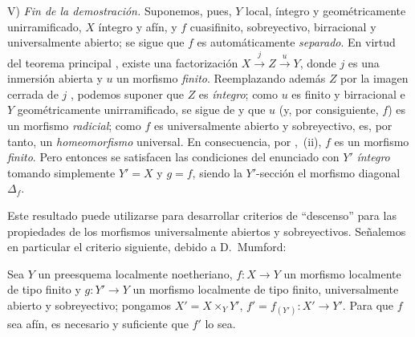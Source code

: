 V) \emph{Fin de la demostración.}
Suponemos, pues, $Y$ local, íntegro y geométricamente unirramificado, $X$ íntegro y afín, y $f$ cuasifinito, sobreyectivo, birracional y universalmente abierto; se sigue que $f$ es automáticamente \emph{separado}.
En virtud del teorema principal , existe una factorización $X\xrightarrow{j}Z\xrightarrow{u}Y$, donde $j$ es una inmersión abierta y $u$ un morfismo \emph{finito}.
Reemplazando además $Z$ por la imagen cerrada de $j$ , podemos suponer que $Z$ es \emph{íntegro}; como $u$ es finito y birracional e $Y$ geométricamente unirramificado, se sigue de  y  que $u$ (y, por consiguiente, $f$) es un morfismo \emph{radicial}; como $f$ es universalmente abierto y sobreyectivo, es, por tanto, un \emph{homeomorfismo} universal.
En consecuencia, por ,~(ii), $f$ es un morfismo \emph{finito}.
Pero entonces se satisfacen las condiciones del enunciado con $Y'$ \emph{íntegro} tomando simplemente $Y'=X$ y $g=f$, siendo la $Y'$-sección el morfismo diagonal $\Delta_f$.

Este resultado puede utilizarse para desarrollar criterios de ``descenso'' para las propiedades de los morfismos universalmente abiertos y sobreyectivos.
Señalemos en particular el criterio siguiente, debido a D.\ Mumford:

\begin{corollary}[14.5.11]
\label{IV.14.5.11}
Sea $Y$ un preesquema localmente noetheriano, $f:X\to Y$ un morfismo localmente de tipo finito y $g:Y'\to Y$ un morfismo localmente de tipo finito, universalmente abierto y sobreyectivo; pongamos $X'=X\times_Y Y'$, $f'=f_{(Y')}:X'\to Y'$.
Para que $f$ sea afín, es necesario y suficiente que $f'$ lo sea.
\end{corollary}

